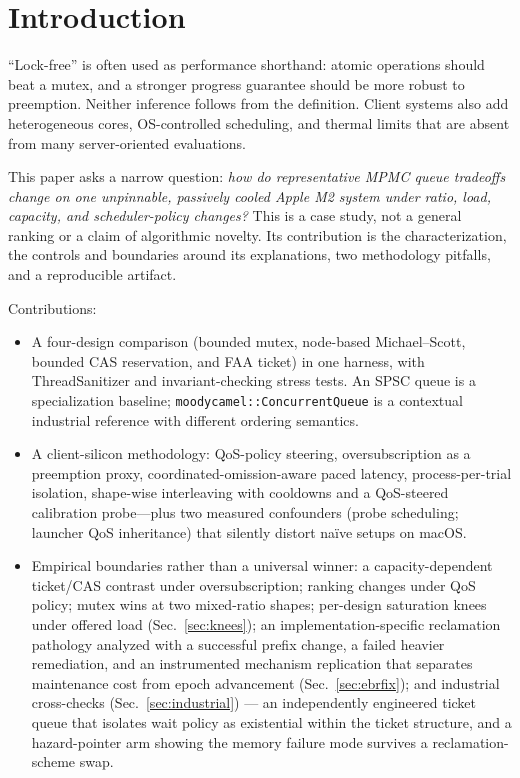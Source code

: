\documentclass[conference]{IEEEtran}
\begin{document}
\section{Introduction}
``Lock-free'' is often used as performance shorthand: atomic operations should
beat a mutex, and a stronger progress guarantee should be more robust to
preemption. Neither inference follows from the definition. Client systems also
add heterogeneous cores, OS-controlled scheduling, and thermal limits that are
absent from many server-oriented evaluations.

This paper asks a narrow question: \emph{how do representative MPMC queue
tradeoffs change on one unpinnable, passively cooled Apple M2 system under
ratio, load, capacity, and scheduler-policy changes?} This is a case study, not
a general ranking or a claim of algorithmic novelty. Its contribution is the
characterization, the controls and boundaries around its explanations, two
methodology pitfalls, and a reproducible artifact.

Contributions:
\begin{itemize}
  \item A four-design comparison (bounded mutex, node-based Michael--Scott,
        bounded CAS reservation, and FAA ticket) in one harness, with
        ThreadSanitizer and invariant-checking stress tests. An SPSC queue is a
        specialization baseline; \texttt{moodycamel::ConcurrentQueue} is a
        contextual industrial reference with different ordering semantics.
  \item A client-silicon methodology: QoS-policy steering, oversubscription
        as a preemption proxy, coordinated-omission-aware paced latency,
        process-per-trial isolation, shape-wise interleaving with cooldowns and a
        QoS-steered calibration probe---plus two measured confounders (probe
        scheduling; launcher QoS inheritance) that silently distort na\"ive
        setups on macOS.
  \item Empirical boundaries rather than a universal winner: a
        capacity-dependent ticket/CAS contrast under oversubscription; ranking
        changes under QoS policy; mutex wins at two mixed-ratio shapes;
        per-design saturation knees under offered load
        (Sec.~\ref{sec:knees}); an implementation-specific reclamation
        pathology analyzed with a successful prefix change, a failed heavier
        remediation, and an instrumented mechanism replication that separates
        maintenance cost from epoch advancement (Sec.~\ref{sec:ebrfix}); and
        industrial cross-checks (Sec.~\ref{sec:industrial}) --- an
        independently engineered ticket queue that isolates wait policy as
        existential within the ticket structure, and a hazard-pointer arm
        showing the memory failure mode survives a reclamation-scheme swap.
\end{itemize}
\end{document}
